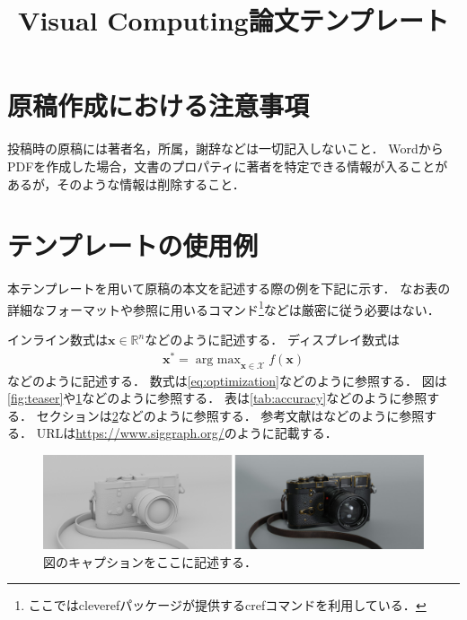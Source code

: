 \documentclass[anonymous]{vc}
\title{Visual Computing論文テンプレート}
\begin{document}
\maketitle


\section{原稿作成における注意事項}

投稿時の原稿には著者名，所属，謝辞などは一切記入しないこと．
WordからPDFを作成した場合，文書のプロパティに著者を特定できる情報が入ることがあるが，そのような情報は削除すること．

\section{テンプレートの使用例}
\label{sec:template}

本テンプレートを用いて原稿の本文を記述する際の例を下記に示す．
なお表の詳細なフォーマットや参照に用いるコマンド\footnote{ここでは\textsf{cleveref}パッケージが提供する\textsf{cref}コマンド\cite{Wikibooks:LaTeX:Ref}を利用している．}などは厳密に従う必要はない．

インライン数式は$\mathbf{x} \in \mathbb{R}^{n}$などのように記述する．
ディスプレイ数式は
\begin{align}
  \mathbf{x}^{*} = \mathop{\text{arg max}}_{\mathbf{x} \in \mathcal{X}} f(\mathbf{x})
  \label{eq:optimization}
\end{align}
などのように記述する．
数式は\cref{eq:optimization}などのように参照する．
図は\cref{fig:teaser}や\cref{fig:leica}などのように参照する．
表は\cref{tab:accuracy}などのように参照する．
セクションは\cref{sec:template}などのように参照する．
参考文献は\cite{GSC12,WL00}などのように参照する．
URLは\url{https://www.siggraph.org/}のように記載する．

\begin{figure}
  \centering
  \includegraphics[width=\columnwidth]{./figures/leica.pdf}
  \caption{図のキャプションをここに記述する．}
  \label{fig:leica}
\end{figure}
\end{document}
